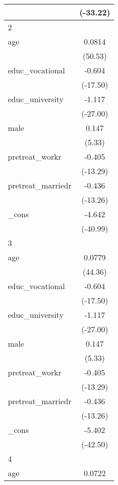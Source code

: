 {\begin{tabular}{l*{1}{c}}
            &    (-33.22)         \\
\hline
2           &                     \\
age         &      0.0814\sym{***}\\
            &     (50.53)         \\
[1em]
educ\_vocational&      -0.604\sym{***}\\
            &    (-17.50)         \\
[1em]
educ\_university&      -1.117\sym{***}\\
            &    (-27.00)         \\
[1em]
male        &       0.147\sym{***}\\
            &      (5.33)         \\
[1em]
pretreat\_workr&      -0.405\sym{***}\\
            &    (-13.29)         \\
[1em]
pretreat\_marriedr&      -0.436\sym{***}\\
            &    (-13.26)         \\
[1em]
\_cons      &      -4.642\sym{***}\\
            &    (-40.99)         \\
\hline
3           &                     \\
age         &      0.0779\sym{***}\\
            &     (44.36)         \\
[1em]
educ\_vocational&      -0.604\sym{***}\\
            &    (-17.50)         \\
[1em]
educ\_university&      -1.117\sym{***}\\
            &    (-27.00)         \\
[1em]
male        &       0.147\sym{***}\\
            &      (5.33)         \\
[1em]
pretreat\_workr&      -0.405\sym{***}\\
            &    (-13.29)         \\
[1em]
pretreat\_marriedr&      -0.436\sym{***}\\
            &    (-13.26)         \\
[1em]
\_cons      &      -5.402\sym{***}\\
            &    (-42.50)         \\
\hline
4           &                     \\
age         &      0.0722\sym{***}\\

\end{tabular}}
